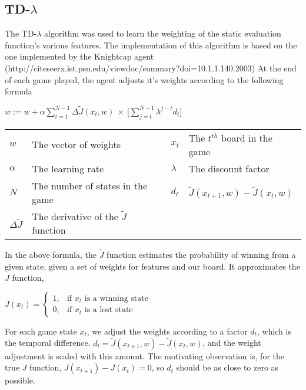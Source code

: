 \documentclass[11pt,twocolumn]{article}
\newcommand{\tdl}{TD-$\lambda$ }
\begin{document}
\subsection{\tdl}
The \tdl algorithm was used to learn the weighting of the static evaluation function's various features. The implementation of this algorithm is based on the one implemented by the Knightcap agent (http://citeseerx.ist.psu.edu/viewdoc/summary?doi=10.1.1.140.2003) %
At the end of each game played, the agent adjusts it's weights according to the following formula
\begin{center}

    $\displaystyle w := w + \alpha \sum _{t=1} ^{N-1} \Delta \tilde{J}(x_t,w) \: \times \: \Big[ \sum ^ {N-1} _{j=t} \lambda^{j-t} d_t \Big] $\\
        
    \begin{tabular}{  l l | l l }
      $w$                   & The vector of weights                         &$x_t$  & The $t^{th}$ board in the game \\
      $\alpha$              & The learning rate                             &$\lambda$      &The discount factor \\
      $N$                   & The number of states in the game              &$d_t$          &$\tilde{J}(x_{t+1},w) - \tilde{J}(x_t,w)$\\
      $\Delta \tilde{J}$    & The derivative of the $\tilde{J}$ function    &               &\\
    \end{tabular}
\end{center}
In the above formula, the $\tilde{J}$ function estimates the probability of winning from a given state, given a set of weights for features and our board. It approximates the $J$ function, \\
\begin{center}
$
J(x_t) = \begin{cases} 1, & \mbox{if } x_t\mbox{ is a winning state} \\ 0, & \mbox{if } x_t\mbox{ is a lost state} \end{cases}
$
\end{center}
For each game state $x_t$, we adjust the weights according to a factor $d_t$, which is the temporal difference. $d_t = \tilde{J}(x_{t+1},w) - \tilde{J}(x_t,w)$, and the weight adjustment is scaled with this amount. The motivating observation is, for the true $J$ function, $J(x_{t+1}) - J(x_t) = 0$, so $d_t$ should be as close to zero as possible.
\end{document}
